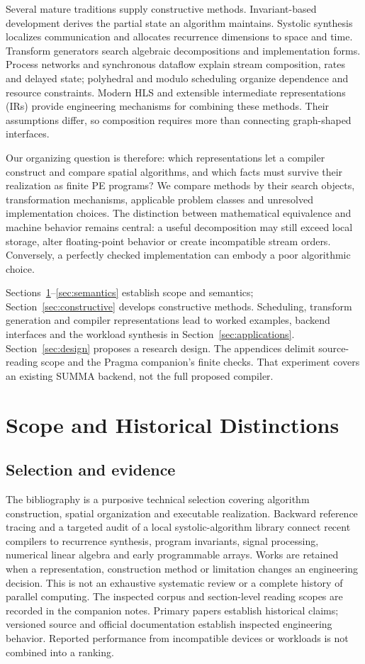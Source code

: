 \documentclass[final,3p,times,authoryear]{elsarticle}
\begin{document}
Several mature traditions supply constructive methods. Invariant-based development derives the partial state an algorithm maintains. Systolic synthesis localizes communication and allocates recurrence dimensions to space and time. Transform generators search algebraic decompositions and implementation forms. Process networks and synchronous dataflow explain stream composition, rates and delayed state; polyhedral and modulo scheduling organize dependence and resource constraints. Modern HLS and extensible intermediate representations (IRs) provide engineering mechanisms for combining these methods. Their assumptions differ, so composition requires more than connecting graph-shaped interfaces.

Our organizing question is therefore: which representations let a compiler construct and compare spatial algorithms, and which facts must survive their realization as finite PE programs? We compare methods by their search objects, transformation mechanisms, applicable problem classes and unresolved implementation choices. The distinction between mathematical equivalence and machine behavior remains central: a useful decomposition may still exceed local storage, alter floating-point behavior or create incompatible stream orders. Conversely, a perfectly checked implementation can embody a poor algorithmic choice.

Sections~\ref{sec:scope}--\ref{sec:semantics} establish scope and semantics; Section~\ref{sec:constructive} develops constructive methods. Scheduling, transform generation and compiler representations lead to worked examples, backend interfaces and the workload synthesis in Section~\ref{sec:applications}. Section~\ref{sec:design} proposes a research design. The appendices delimit source-reading scope and the Pragma companion's finite checks. That experiment covers an existing SUMMA backend, not the full proposed compiler.



\section{Scope and Historical Distinctions}\label{sec:scope}
\subsection{Selection and evidence}
The bibliography is a purposive technical selection covering algorithm construction, spatial organization and executable realization. Backward reference tracing and a targeted audit of a local systolic-algorithm library connect recent compilers to recurrence synthesis, program invariants, signal processing, numerical linear algebra and early programmable arrays. Works are retained when a representation, construction method or limitation changes an engineering decision. This is not an exhaustive systematic review or a complete history of parallel computing. The inspected corpus and section-level reading scopes are recorded in the companion notes. Primary papers establish historical claims; versioned source and official documentation establish inspected engineering behavior. Reported performance from incompatible devices or workloads is not combined into a ranking.
\end{document}
